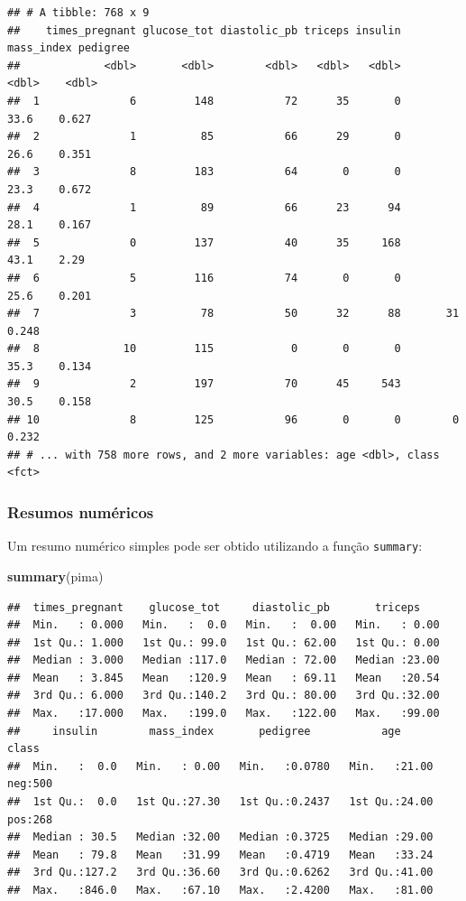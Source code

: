 \documentclass[
]{book}
\newenvironment{Shaded}{\begin{snugshade}}{\end{snugshade}}
\newcommand{\KeywordTok}[1]{\textcolor[rgb]{0.13,0.29,0.53}{\textbf{#1}}}
\newcommand{\NormalTok}[1]{#1}
\theoremstyle{definition}
\theoremstyle{definition}
\theoremstyle{definition}
\theoremstyle{remark}
\begin{document}
\begin{verbatim}
## # A tibble: 768 x 9
##    times_pregnant glucose_tot diastolic_pb triceps insulin mass_index pedigree
##             <dbl>       <dbl>        <dbl>   <dbl>   <dbl>      <dbl>    <dbl>
##  1              6         148           72      35       0       33.6    0.627
##  2              1          85           66      29       0       26.6    0.351
##  3              8         183           64       0       0       23.3    0.672
##  4              1          89           66      23      94       28.1    0.167
##  5              0         137           40      35     168       43.1    2.29 
##  6              5         116           74       0       0       25.6    0.201
##  7              3          78           50      32      88       31      0.248
##  8             10         115            0       0       0       35.3    0.134
##  9              2         197           70      45     543       30.5    0.158
## 10              8         125           96       0       0        0      0.232
## # ... with 758 more rows, and 2 more variables: age <dbl>, class <fct>
\end{verbatim}

\hypertarget{resumos-numuxe9ricos}{%
\subsubsection*{Resumos numéricos}\label{resumos-numuxe9ricos}}

Um resumo numérico simples pode ser obtido utilizando a função \texttt{summary}:

\begin{Shaded}
\begin{Highlighting}[]
\KeywordTok{summary}\NormalTok{(pima)}
\end{Highlighting}
\end{Shaded}

\begin{verbatim}
##  times_pregnant    glucose_tot     diastolic_pb       triceps     
##  Min.   : 0.000   Min.   :  0.0   Min.   :  0.00   Min.   : 0.00  
##  1st Qu.: 1.000   1st Qu.: 99.0   1st Qu.: 62.00   1st Qu.: 0.00  
##  Median : 3.000   Median :117.0   Median : 72.00   Median :23.00  
##  Mean   : 3.845   Mean   :120.9   Mean   : 69.11   Mean   :20.54  
##  3rd Qu.: 6.000   3rd Qu.:140.2   3rd Qu.: 80.00   3rd Qu.:32.00  
##  Max.   :17.000   Max.   :199.0   Max.   :122.00   Max.   :99.00  
##     insulin        mass_index       pedigree           age        class    
##  Min.   :  0.0   Min.   : 0.00   Min.   :0.0780   Min.   :21.00   neg:500  
##  1st Qu.:  0.0   1st Qu.:27.30   1st Qu.:0.2437   1st Qu.:24.00   pos:268  
##  Median : 30.5   Median :32.00   Median :0.3725   Median :29.00            
##  Mean   : 79.8   Mean   :31.99   Mean   :0.4719   Mean   :33.24            
##  3rd Qu.:127.2   3rd Qu.:36.60   3rd Qu.:0.6262   3rd Qu.:41.00            
##  Max.   :846.0   Max.   :67.10   Max.   :2.4200   Max.   :81.00
\end{verbatim}
\end{document}
